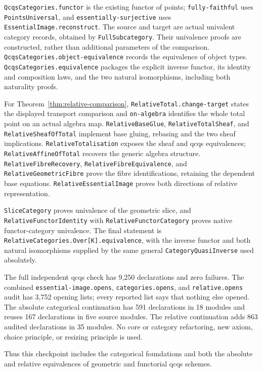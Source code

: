 \documentclass[11pt]{amsart}
\theoremstyle{definition}
\theoremstyle{remark}
\newcommand{\code}[1]{\texttt{\small #1}}
\begin{document}
\code{QcqsCategories.functor} is the existing functor of points;
\code{fully-faithful} uses \code{PointsUniversal}, and
\code{essentially-surjective} uses \code{EssentialImage.reconstruct}.
The source and target are actual univalent category records, obtained
by \code{FullSubcategory}. Their univalence proofs are constructed,
rather than additional parameters of the comparison.
\code{QcqsCategories.object-equivalence} records the equivalence of
object types. \code{QcqsCategories.equivalence} packages the explicit
inverse functor, its identity and composition laws, and the two natural
isomorphisms, including both naturality proofs.

For Theorem~\ref{thm:relative-comparison},
\code{RelativeTotal.change-target} states the displayed transport
comparison and \code{on-algebra} identifies the whole total point on
an actual algebra map. \code{RelativeBaseGlue},
\code{RelativeTotalSheaf}, and \code{RelativeSheafOfTotal} implement
base gluing, rebasing and the two sheaf implications.
\code{RelativeTotalisation} exposes the sheaf and qcqs equivalences;
\code{RelativeAffineOfTotal} recovers the generic algebra structure.
\code{RelativeFibreRecovery}, \code{RelativeFibreEquivalence}, and
\code{RelativeGeometricFibre} prove the fibre identifications, retaining
the dependent base equations. \code{RelativeEssentialImage} proves
both directions of relative representation.

\code{SliceCategory} proves univalence of the geometric slice, and
\code{RelativeFunctorIdentity} with \code{RelativeFunctorCategory}
proves native functor-category univalence. The final statement is
\code{RelativeCategories.Over[K].equivalence}, with the inverse functor
and both natural isomorphisms supplied by the same general
\code{CategoryQuasiInverse} used absolutely.

The full independent qcqs check has 9,250 declarations and zero failures.
The combined \code{essential-image.opens}, \code{categories.opens}, and
\code{relative.opens} audit has 3,752 opening lists; every reported list
says that nothing else opened. The absolute categorical continuation
has 591 declarations in 18 modules and reuses 167 declarations in five
source modules. The relative continuation adds 863 audited declarations
in 35 modules. No core or category refactoring, new axiom, choice
principle, or resizing principle is used.

Thus this checkpoint includes the categorical foundations and both the
absolute and relative equivalences of geometric and functorial qcqs
schemes.
\par\endgroup
\end{document}
